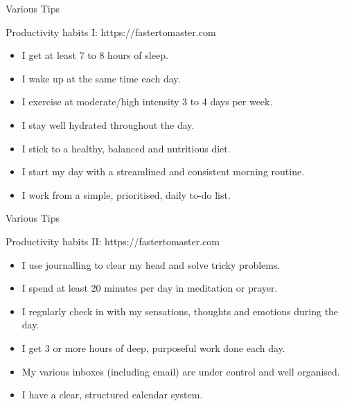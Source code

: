 \begin{frame}{Various Tips}
  \begin{block}{Productivity habits I: https://fastertomaster.com}
    \begin{itemize}
      \item I get at least 7 to 8 hours of sleep.
      \item I wake up at the same time each day.
      \item I exercise at moderate/high intensity 3 to 4 days per week.
      \item I stay well hydrated throughout the day.
      \item I stick to a healthy, balanced and nutritious diet.
      \item I start my day with a streamlined and consistent morning routine.
      \item I work from a simple, prioritised, daily to-do list.
    \end{itemize}
  \end{block}
\end{frame}

\begin{frame}{Various Tips}
  \begin{block}{Productivity habits II: https://fastertomaster.com}
    \begin{itemize}
      \item I use journalling to clear my head and solve tricky problems.
      \item I spend at least 20 minutes per day in meditation or prayer.
      \item I regularly check in with my sensations, thoughts and emotions during the day.
      \item I get 3 or more hours of deep, purposeful work done each day.
      \item My various inboxes (including email) are under control and well organised.
      \item I have a clear, structured calendar system.
    \end{itemize}
  \end{block}
\end{frame}

